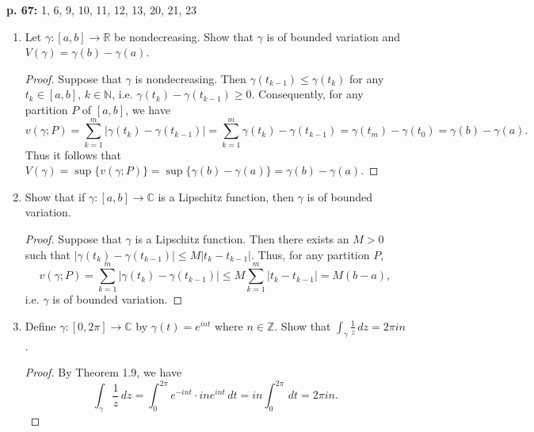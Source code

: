 \documentclass[11pt,oneside,english]{amsart}
\theoremstyle{definition}
\newcommand{\lspace}{\vspace{5mm}}
\newcommand{\MB}[1]{\mathbb{#1}}
\begin{document}
\rightline{\today}

\lspace



\textbf{p. 67:} 1, 6, 9, 10, 11, 12, 13, 20, 21, 23


\begin{enumerate}[leftmargin=*]
\itemsep5mm

\item Let $\gamma:[a,b]\to\MB{R}$ be nondecreasing. Show that $\gamma$ is of bounded variation and $V(\gamma)=\gamma(b)-\gamma(a)$.

\begin{proof}
Suppose that $\gamma$ is nondecreasing. Then $\gamma(t_{k-1})\leq \gamma(t_k)$ for any $t_k\in[a,b]$, $k\in\MB{N}$, i.e. $\gamma(t_k)-\gamma(t_{k-1})\geq0$. Consequently, for any partition $P$ of $[a,b]$, we have
\[
v(\gamma;P)=\sum_{k=1}^m|\gamma(t_k)-\gamma(t_{k-1})|=\sum_{k=1}^m\gamma(t_k)-\gamma(t_{k-1})=\gamma(t_m)-\gamma(t_0)=\gamma(b)-\gamma(a).
\] 
Thus it follows that $V(\gamma)=\sup\{v(\gamma;P)\}=\sup\{\gamma(b)-\gamma(a)\}=\gamma(b)-\gamma(a)$.
\end{proof}

\setcounter{enumi}{5}

\item Show that if $\gamma:[a,b]\to\MB{C}$ is a Lipschitz function, then $\gamma$ is of bounded variation.

\begin{proof}
Suppose that $\gamma$ is a Lipschitz function. Then there exists an $M>0$ such that $|\gamma(t_k)-\gamma(t_{k-1})|\leq M|t_k-t_{k-1}|$. Thus, for any partition $P$,
\[
v(\gamma;P)=\sum_{k=1}^m|\gamma(t_k)-\gamma(t_{k-1})|\leq M\sum_{k=1}^m|t_k-t_{k-1}|=M(b-a),
\]
i.e. $\gamma$ is of bounded variation.
\end{proof}

\setcounter{enumi}{8}

\item Define $\gamma:[0,2\pi]\to\MB{C}$ by $\gamma(t)=e^{int}$ where $n\in\MB{Z}$. Show that $\displaystyle \int_\gamma \frac{1}{z}\,dz=2\pi i n$.

\begin{proof}
By Theorem 1.9, we have
\[
\int_\gamma\frac{1}{z}\,dz=\int_0^{2\pi} e^{-int}\cdot ine^{int}\,dt=in \int_0^{2\pi}\,dt=2\pi in.
\]
\end{proof}

\pagebreak


\end{enumerate}
\end{document}
